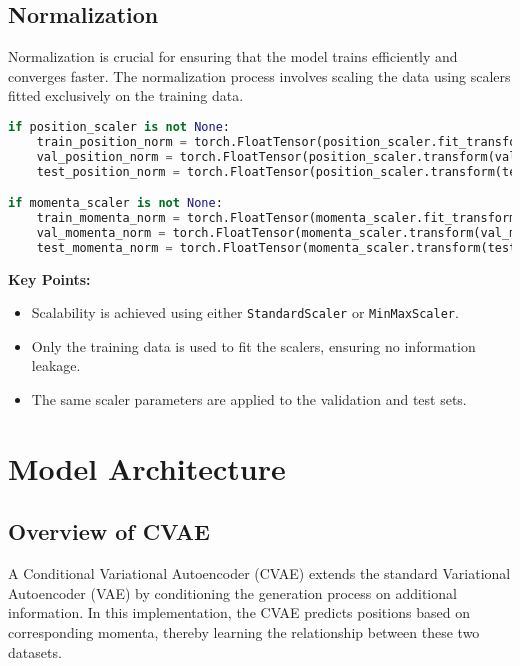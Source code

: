 \documentclass[10pt]{article}
\begin{document}
\subsection{Normalization}
Normalization is crucial for ensuring that the model trains efficiently and converges faster. The normalization process involves scaling the data using scalers fitted exclusively on the training data.

\begin{lstlisting}[language=Python, caption=Normalization Procedure]
if position_scaler is not None:
    train_position_norm = torch.FloatTensor(position_scaler.fit_transform(train_position.cpu())).to(device)
    val_position_norm = torch.FloatTensor(position_scaler.transform(val_position.cpu())).to(device)
    test_position_norm = torch.FloatTensor(position_scaler.transform(test_position.cpu())).to(device)

if momenta_scaler is not None:
    train_momenta_norm = torch.FloatTensor(momenta_scaler.fit_transform(train_momenta.cpu())).to(device)
    val_momenta_norm = torch.FloatTensor(momenta_scaler.transform(val_momenta.cpu())).to(device)
    test_momenta_norm = torch.FloatTensor(momenta_scaler.transform(test_momenta.cpu())).to(device)
\end{lstlisting}

\textbf{Key Points:}
\begin{itemize}
    \item Scalability is achieved using either \texttt{StandardScaler} or \texttt{MinMaxScaler}.
    \item Only the training data is used to fit the scalers, ensuring no information leakage.
    \item The same scaler parameters are applied to the validation and test sets.
\end{itemize}

\section{Model Architecture}

\subsection{Overview of CVAE}
A Conditional Variational Autoencoder (CVAE) extends the standard Variational Autoencoder (VAE) by conditioning the generation process on additional information. In this implementation, the CVAE predicts positions based on corresponding momenta, thereby learning the relationship between these two datasets.
\end{document}
